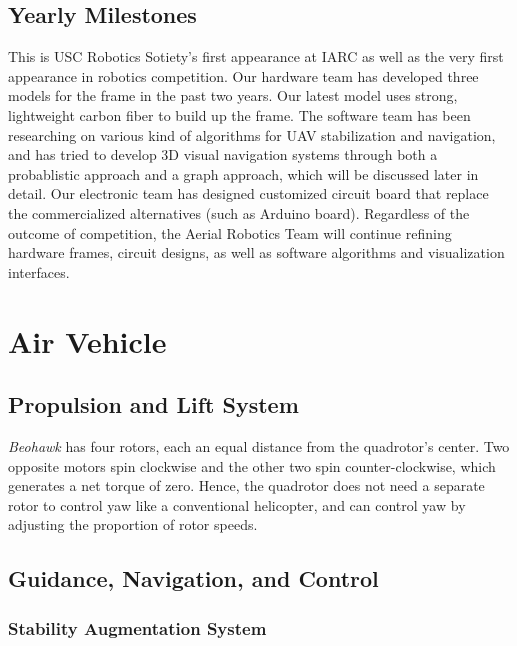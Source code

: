 \documentclass[12pt, letterpaper]{article}
\begin{document}
\subsection{Yearly Milestones}

This is USC Robotics Sotiety's first appearance at IARC as well as the very first appearance in robotics competition. Our hardware team has developed three models for the frame in the past two years. Our latest model uses strong, lightweight carbon fiber to build up the frame. The software team has been researching on various kind of algorithms for UAV stabilization and navigation, and has tried to develop 3D visual navigation systems through both a probablistic approach and a graph approach,  which will be discussed later in detail. Our electronic team has designed customized circuit board that replace the commercialized alternatives (such as Arduino board). Regardless of the outcome of competition, the Aerial Robotics Team will continue refining hardware frames, circuit designs, as well as software algorithms and visualization interfaces.


\section{Air Vehicle}

\subsection{Propulsion and Lift System}
\emph{Beohawk} has four rotors, each an equal distance from the quadrotor's center.  Two opposite motors spin clockwise and the other two spin counter-clockwise, which generates a net torque of zero.  Hence, the quadrotor does not need a separate rotor to control yaw like a conventional helicopter, and can control yaw by adjusting the proportion of rotor speeds.  

\subsection{Guidance, Navigation, and Control}

\subsubsection{Stability Augmentation System}
\end{document}
